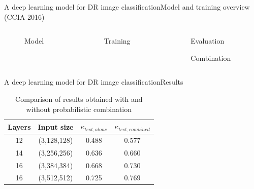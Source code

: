 \documentclass{beamer}
\begin{document}
\begin{frame}{A deep learning model for DR image classification}{Model and training overview (CCIA 2016)}	
	\begin{columns}
		\begin{column}{0.2\textwidth}
			\centering
			\begin{figure}[p]
			\caption{Model}
			\end{figure}
		\end{column}
		\begin{column}{0.5\textwidth}
			\begin{figure}[p]
				\caption{Training}
			\end{figure}	
		\end{column}
		\begin{column}{0.3\textwidth}  %
			\begin{figure}[p]
				\caption{Evaluation}
			\end{figure}
			\begin{figure}[p]
				\caption{Combination}
			\end{figure}
		\end{column}
	\end{columns}	
\end{frame}

\begin{frame}{A deep learning model for DR image classification}{Results}	
\begin{table}[h!]
	\centering
	\begin{tabular}{c c c c} 
		\hline		
		Layers & Input size & $\kappa_{test, alone}$ & $\kappa_{test, combined}$\\ [0.5ex] 
		\hline\hline
		12 & (3,128,128) & 0.488 & 0.577\\ 
		14 & (3,256,256) & 0.636 & 0.660\\ 
		16 & (3,384,384) & 0.668 & 0.730 \\ 
		16 & (3,512,512) & 0.725 & 0.769\\ 
		\hline
	\end{tabular}
	\caption{Comparison of results obtained with and without probabilistic combination}
	\label{table-results2}
\end{table}
\end{frame}
\end{document}
